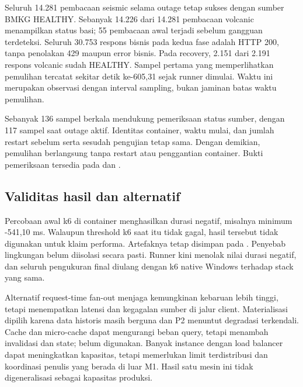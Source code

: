Seluruh 14.281 pembacaan seismic selama outage tetap sukses dengan sumber BMKG HEALTHY. Sebanyak 14.226 dari 14.281 pembacaan volcanic menampilkan status basi; 55 pembacaan awal terjadi sebelum gangguan terdeteksi. Seluruh 30.753 respons bisnis pada kedua fase adalah HTTP 200, tanpa penolakan 429 maupun error bisnis. Pada recovery, 2.151 dari 2.191 respons volcanic sudah HEALTHY. Sampel pertama yang memperlihatkan pemulihan tercatat sekitar detik ke-605,31 sejak runner dimulai. Waktu ini merupakan observasi dengan interval sampling, bukan jaminan batas waktu pemulihan.

Sebanyak 136 sampel berkala mendukung pemeriksaan status sumber, dengan 117 sampel saat outage aktif. Identitas container, waktu mulai, dan jumlah restart sebelum serta sesudah pengujian tetap sama. Dengan demikian, pemulihan berlangsung tanpa restart atau penggantian container. Bukti pemeriksaan tersedia pada  dan .

\subsection{Validitas hasil dan alternatif}
Percobaan awal k6 di container menghasilkan durasi negatif, misalnya minimum -541,10 ms. Walaupun threshold k6 saat itu tidak gagal, hasil tersebut tidak digunakan untuk klaim performa. Artefaknya tetap disimpan pada . Penyebab lingkungan belum diisolasi secara pasti. Runner kini menolak nilai durasi negatif, dan seluruh pengukuran final diulang dengan k6 native Windows terhadap stack yang sama.

Alternatif request-time fan-out menjaga kemungkinan kebaruan lebih tinggi, tetapi menempatkan latensi dan kegagalan sumber di jalur client. Materialisasi dipilih karena data historis masih berguna dan P2 menuntut degradasi terkendali. Cache dan micro-cache dapat mengurangi beban query, tetapi menambah invalidasi dan state; belum digunakan. Banyak instance dengan load balancer dapat meningkatkan kapasitas, tetapi memerlukan limit terdistribusi dan koordinasi penulis yang berada di luar M1. Hasil satu mesin ini tidak digeneralisasi sebagai kapasitas produksi.
